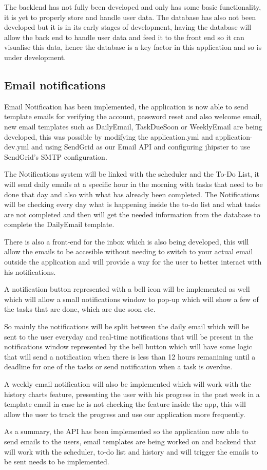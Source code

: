\documentclass[a4paper]{article}
\begin{document}
{The backlend has not fully been developed and only has some basic functionality, it is yet to properly store and handle user data. The database has also not been developed but it is in its early stages of development, having the database will allow the back end to handle user data and feed it to the front end so it can visualise this data, hence the database is a key factor in this application and so is under development. 

\subsection{Email notifications}

Email Notification has been implemented, the application is now able to send template emails for verifying the account, password reset and also welcome email, new email templates such as DailyEmail, TaskDueSoon or WeeklyEmail are being developed, this was possible by modifying the application.yml and application-dev.yml and using SendGrid as our Email API and configuring jhipster to use SendGrid's SMTP configuration. 

The Notifications system will be linked with the scheduler and the To-Do List, it will send daily emails at a specific hour in the morning with tasks that need to be done that day and also with what has already been completed. The Notifications will be checking every day what is happening inside the to-do list and what tasks are not completed and then will get the needed information from the database to complete the DailyEmail template.

There is also a front-end for the inbox which is also being developed, this will allow the emails to be accesible without needing to switch to your actual email outside the application and will provide a way for the user to better interact with his notifications.

A notification button represented with a bell icon will be implemented as well which will allow a small notifications window to pop-up which will show a few of the tasks that are done, which are due soon etc.

So mainly the notifications will be split between the daily email which will be sent to the user everyday and real-time notifications that will be present in the notifications window represented by the bell button which will have some logic that will send a notification when there is less than 12 hours remanining until a deadline for one of the tasks or send notification when a task is overdue.

A weekly email notification will also be implemented which will work with the history charts feature, presenting the user with his progress in the past week in a template email in case he is not checking the feature inside the app, this will allow the user to track the progress and use our application more frequently.

As a summary, the API has been implemented so the application now able to send emails to the users, email templates are being worked on and backend that will work with the scheduler, to-do list and history and will trigger the emails to be sent needs to be implemented.

}
\end{document}
